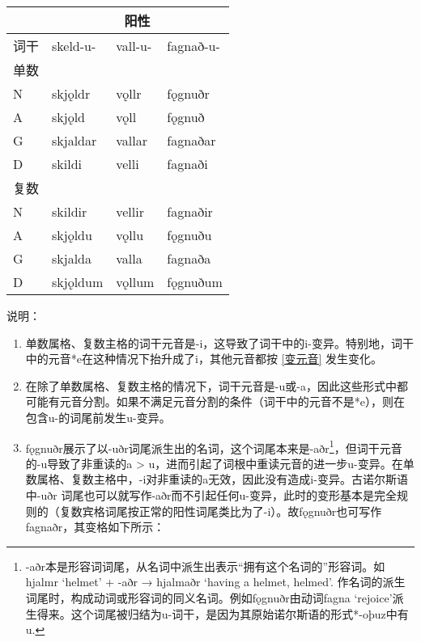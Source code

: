 \begin{longtable}{llll}
  \toprule
       & \multicolumn{3}{c}{\textbf{阳性}}                       \\
  \midrule
  \endhead
  \bottomrule
  \endfoot
  词干 & skeld-u-                          & vall-u- & fagnað-u- \\
  单数 &                                   &         &           \\
  N    & skjǫldr                           & vǫllr   & fǫgnuðr   \\
  A    & skjǫld                            & vǫll    & fǫgnuð    \\
  G    & skjaldar                          & vallar  & fagnaðar  \\
  D    & skildi                            & velli   & fagnaði   \\
  复数 &                                   &         &           \\
  N    & skildir                           & vellir  & fagnaðir  \\
  A    & skjǫldu                           & vǫllu   & fǫgnuðu   \\
  G    & skjalda                           & valla   & fagnaða   \\
  D    & skjǫldum                          & vǫllum  & fǫgnuðum  \\
\end{longtable}

说明：

\begin{enumerate}
  \item
        单数属格、复数主格的词干元音是-i，这导致了词干中的i-变异。特别地，词干中的元音*e在这种情况下抬升成了i，其他元音都按 \ref{变元音} 发生变化。
  \item
        在除了单数属格、复数主格的情况下，词干元音是-u或-a，因此这些形式中都可能有元音分割。如果不满足元音分割的条件（词干中的元音不是*e），则在包含u-的词尾前发生u-变异。
  \item
        fǫgnuðr展示了以-uðr词尾派生出的名词，这个词尾本来是-aðr\footnote{-aðr本是形容词词尾，从名词中派生出表示``拥有这个名词的''形容词。如hjalmr
          `helmet' + -aðr → hjalmaðr `having a helmet, helmed'.
          作名词的派生词尾时，构成动词或形容词的同义名词。例如fǫgnuðr由动词fagna
          `rejoice'派生得来。这个词尾被归结为u-词干，是因为其原始诺尔斯语的形式*-oþuz中有u.}，但词干元音的-u导致了非重读的a
        \textgreater{}
        u，进而引起了词根中重读元音的进一步u-变异。在单数属格、复数主格中，-i对非重读的a无效，因此没有造成i-变异。古诺尔斯语中-uðr
        词尾也可以就写作-aðr而不引起任何u-变异，此时的变形基本是完全规则的（复数宾格词尾按正常的阳性词尾类比为了-i）。故fǫgnuðr也可写作fagnaðr，其变格如下所示：
\end{enumerate}

